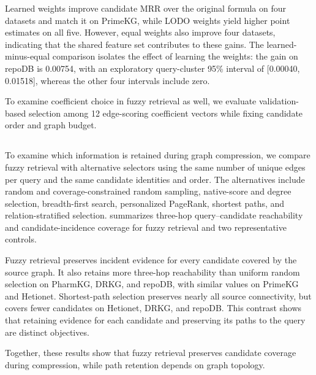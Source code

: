 \begin{revisionblock}

Learned weights improve candidate MRR over the original formula on four datasets and match it on PrimeKG, while LODO weights yield higher point estimates on all five. However, equal weights also improve four datasets, indicating that the shared feature set contributes to these gains. The learned-minus-equal comparison isolates the effect of learning the weights: the gain on repoDB is 0.00754, with an exploratory query-cluster 95\% interval of [0.00040, 0.01518], whereas the other four intervals include zero.

To examine coefficient choice in fuzzy retrieval as well, we evaluate validation-based selection among 12 edge-scoring coefficient vectors while fixing candidate order and graph budget.
\end{revisionblock}

\subsection{}
\label{sec:retention_results}
\begin{revisionblock}
To examine which information is retained during graph compression, we compare fuzzy retrieval with alternative selectors using the same number of unique edges per query and the same candidate identities and order. The alternatives include random and coverage-constrained random sampling, native-score and degree selection, breadth-first search, personalized PageRank, shortest paths, and relation-stratified selection.  summarizes three-hop query--candidate reachability and candidate-incidence coverage for fuzzy retrieval and two representative controls.

Fuzzy retrieval preserves incident evidence for every candidate covered by the source graph. It also retains more three-hop reachability than uniform random selection on PharmKG, DRKG, and repoDB, with similar values on PrimeKG and Hetionet. Shortest-path selection preserves nearly all source connectivity, but covers fewer candidates on Hetionet, DRKG, and repoDB. This contrast shows that retaining evidence for each candidate and preserving its paths to the query are distinct objectives.

Together, these results show that fuzzy retrieval preserves candidate coverage during compression, while path retention depends on graph topology.
\end{revisionblock}
